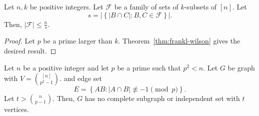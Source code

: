 \begin{corollary} \label{cor:ray-chaudhuri-wilson}
    Let \(n, k\) be positive integers.
    Let \(\mathcal{F}\) be a family of sets of \(k\)-subsets of \([n]\).
    Let
    \begin{equation}
        s = \left|
            \left\{
                |B \cap C| : B, C \in \mathcal{F}
            \right\}
        \right|.
    \end{equation}
    Then, \(|\mathcal{F}| \leq \frac{n}{s}\).
\end{corollary}

\begin{proof}
    Let \(p\) be a prime larger than \(k\).
    Theorem~\ref{thm:frankl-wilson} gives the desired result.
\end{proof}

\begin{theorem} \label{thm:constructive-ramsey-bound}
    Let \(n\) be a positive integer
    and let \(p\) be a prime such that \(p^2 < n\).
    Let \(G\) be  graph with \(V = \binom{[n]}{p^2 - 1}\).
    and edge set
    \begin{equation}
        E = \left\{
            AB : |A \cap B| \not \equiv -1 \pmod{p}
        \right\}.
    \end{equation}
    Let \(t > \binom{n}{p-1}\).
    Then,
    \(G\) has no complete subgraph or independent set with \(t\) vertices.
\end{theorem}

